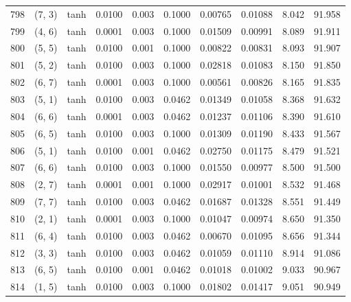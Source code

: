 \begin{tabular}{lllrrrrrrr}
798 &      (7, 3) &      tanh &  0.0100 &  0.003 &  0.1000 &          0.00765 &    0.01088 &       8.042 &    91.958 \\
799 &      (4, 6) &      tanh &  0.0001 &  0.003 &  0.1000 &          0.01509 &    0.00991 &       8.089 &    91.911 \\
800 &      (5, 5) &      tanh &  0.0100 &  0.001 &  0.1000 &          0.00822 &    0.00831 &       8.093 &    91.907 \\
801 &      (5, 2) &      tanh &  0.0100 &  0.003 &  0.1000 &          0.02818 &    0.01083 &       8.150 &    91.850 \\
802 &      (6, 7) &      tanh &  0.0001 &  0.003 &  0.1000 &          0.00561 &    0.00826 &       8.165 &    91.835 \\
803 &      (5, 1) &      tanh &  0.0100 &  0.003 &  0.0462 &          0.01349 &    0.01058 &       8.368 &    91.632 \\
804 &      (6, 6) &      tanh &  0.0001 &  0.003 &  0.0462 &          0.01237 &    0.01106 &       8.390 &    91.610 \\
805 &      (6, 5) &      tanh &  0.0100 &  0.003 &  0.1000 &          0.01309 &    0.01190 &       8.433 &    91.567 \\
806 &      (5, 1) &      tanh &  0.0100 &  0.001 &  0.0462 &          0.02750 &    0.01175 &       8.479 &    91.521 \\
807 &      (6, 6) &      tanh &  0.0100 &  0.003 &  0.1000 &          0.01550 &    0.00977 &       8.500 &    91.500 \\
808 &      (2, 7) &      tanh &  0.0001 &  0.001 &  0.1000 &          0.02917 &    0.01001 &       8.532 &    91.468 \\
809 &      (7, 7) &      tanh &  0.0100 &  0.003 &  0.0462 &          0.01687 &    0.01328 &       8.551 &    91.449 \\
810 &      (2, 1) &      tanh &  0.0001 &  0.003 &  0.1000 &          0.01047 &    0.00974 &       8.650 &    91.350 \\
811 &      (6, 4) &      tanh &  0.0100 &  0.003 &  0.0462 &          0.00670 &    0.01095 &       8.656 &    91.344 \\
812 &      (3, 3) &      tanh &  0.0100 &  0.003 &  0.0462 &          0.01059 &    0.01110 &       8.914 &    91.086 \\
813 &      (6, 5) &      tanh &  0.0100 &  0.001 &  0.0462 &          0.01018 &    0.01002 &       9.033 &    90.967 \\
814 &      (1, 5) &      tanh &  0.0100 &  0.003 &  0.1000 &          0.01802 &    0.01417 &       9.051 &    90.949 \\

\end{tabular}
